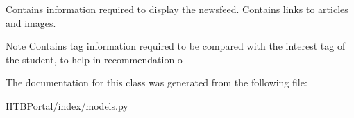 Contains information required to display the newsfeed. Contains links to articles and images. \begin{DoxyNote}{Note}
Contains tag information required to be compared with the interest tag of the student, to help in recommendation o 
\end{DoxyNote}


The documentation for this class was generated from the following file\+:\begin{DoxyCompactItemize}
\item 
I\+I\+T\+B\+Portal/index/models.\+py\end{DoxyCompactItemize}
